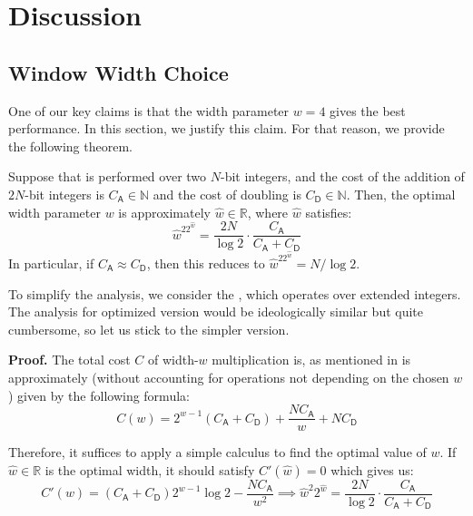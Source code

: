 \documentclass{iacrtrans}
\begin{document}
\section{Discussion}\label{section:discussion}

\subsection{Window Width Choice}

One of our key claims is that the width parameter $w=4$ gives the best performance. In this section, we justify this claim. For that reason, we provide the following theorem.

\begin{theorem}
    Suppose that  is performed over two $N$-bit integers, and the cost of the addition of $2N$-bit integers is $C_{\mathsf{A}} \in \mathbb{N}$ and the cost of doubling is $C_{\mathsf{D}} \in \mathbb{N}$. Then, the optimal width parameter $w$ is approximately $\hat{w} \in \mathbb{R}$, where $\hat{w}$ satisfies:
    \begin{equation}
        \hat{w}^22^{\hat{w}} = \frac{2N}{\log 2} \cdot \frac{C_{\mathsf{A}}}{C_{\mathsf{A}} + C_{\mathsf{D}}}
    \end{equation}
    In particular, if $C_{\mathsf{A}} \approx C_{\mathsf{D}}$, then this reduces to $\hat{w}^22^{\hat{w}} = N/\log 2$.
\end{theorem}

\begin{remark}
    To simplify the analysis, we consider the , which operates over extended integers. The analysis for optimized version  would be ideologically similar but quite cumbersome, so let us stick to the simpler version.
\end{remark}

\textbf{Proof.} The total cost $C$ of width-$w$ multiplication is, as mentioned in  is approximately (without accounting for operations not depending on the chosen $w$) given by the following formula:
\begin{equation}
    C(w) = 2^{w-1}(C_{\mathsf{A}} + C_{\mathsf{D}}) + \frac{NC_{\mathsf{A}}}{w} + NC_{\mathsf{D}}
\end{equation}

Therefore, it suffices to apply a simple calculus to find the optimal value of $w$. If $\hat{w} \in \mathbb{R}$ is the optimal width, it should satisfy $C'(\hat{w}) = 0$ which gives us:
\begin{equation}
    C'(w) = (C_{\mathsf{A}}+C_{\mathsf{D}})2^{w-1}\log 2 - \frac{NC_{\mathsf{A}}}{w^2} \implies \hat{w}^2 2^{\hat{w}} = \frac{2N}{\log 2}\cdot\frac{C_{\mathsf{A}}}{C_{\mathsf{A}}+C_{\mathsf{D}}}
\end{equation}
\end{document}
